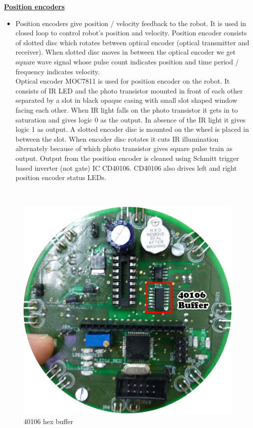 \documentclass[a4paper,12pt,oneside]{book}
\begin{document}
	\underline{\textbf{\Large{Position encoders}}}
	\begin{itemize}
	\item {Position encoders give position / velocity feedback to the robot. It is used in closed loop to
		control robot’s position and velocity. Position encoder consists of slotted disc which rotates
		between optical encoder (optical transmitter and receiver). When slotted disc moves in between
		the optical encoder we get square wave signal whose pulse count indicates position and time
		period / frequency indicates velocity.\\
		Optical encoder MOC7811 is used for position encoder on the robot. It consists of IR LED and
		the photo transistor mounted in front of each other separated by a slot in black opaque casing
		with small slot shaped window facing each other. When IR light falls on the photo transistor it
		gets in to saturation and gives logic 0 as the output. In absence of the IR light it gives logic 1 as
		output. A slotted encoder disc is mounted on the wheel is placed in between the slot. When
		encoder disc rotates it cuts IR illumination alternately because of which photo transistor gives
		square pulse train as output. Output from the position encoder is cleaned using Schmitt trigger
		based inverter (not gate) IC CD40106. CD40106 also drives left and right position encoder status
		LEDs.
	}
	\end{itemize}

	\hfill\\
	\begin{figure}[h!]
		\caption{40106 hex buffer}
		\includegraphics[width=\textwidth]{./HardwareManual/40106_buffer.jpg}
	\end{figure}
\end{document}
